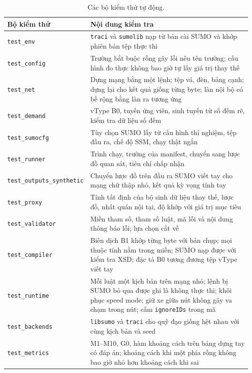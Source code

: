 \documentclass[../main.tex]{subfiles}
\begin{document}
\begin{table}[!htbp]
\centering
\small
\caption{Các bộ kiểm thử tự động.} \label{table:4.5}
\begin{tabular}{|>{\raggedright\arraybackslash}p{3.6cm}|>{\raggedright\arraybackslash}p{9.4cm}|}
\hline
\textbf{Bộ kiểm thử} & \textbf{Nội dung kiểm tra} \\ \hline
\texttt{test\_env} & \texttt{traci} và \texttt{sumolib} nạp từ bản cài SUMO và khớp phiên bản tệp thực thi \\ \hline
\texttt{test\_config} & Trường bắt buộc rỗng gây lỗi nêu tên trường; cấu hình đo thực không bao giờ tự lấy giá trị thay thế \\ \hline
\texttt{test\_net} & Dựng mạng bằng một lệnh; tệp vá, đèn, bảng cạnh; dựng lại cho kết quả giống từng byte; làn nội bộ có bề rộng bằng làn ra tương ứng \\ \hline
\texttt{test\_demand} & vType B0, tuyến ứng viên, sinh tuyến từ số đếm rẽ, kiểm tra dữ liệu số đếm \\ \hline
\texttt{test\_sumocfg} & Tùy chọn SUMO lấy từ cấu hình thí nghiệm, tệp đầu ra, chế độ SSM, chạy thật ngắn \\ \hline
\texttt{test\_runner} & Trình chạy, trường của manifest, chuyển sang lược đồ quan sát, tiêu chí chấp nhận \\ \hline
\texttt{test\_outputs\_\allowbreak synthetic} & Chuyển lược đồ trên đầu ra SUMO viết tay cho mạng chữ thập nhỏ, kết quả kỳ vọng tính tay \\ \hline
\texttt{test\_proxy} & Tính tất định của bộ sinh dữ liệu thay thế, lược đồ, nhất quán nội tại, độ khớp với giá trị mục tiêu \\ \hline
\texttt{test\_validator} & Miền tham số, tham số luật, mã lỗi và nội dung thông báo lỗi; lựa chọn cắt về \\ \hline
\texttt{test\_compiler} & Biên dịch B1 khớp từng byte với bản chụp; mọi thuộc tính nằm trong miền; SUMO nạp được với kiểm tra XSD; đặc tả B0 tương đương tệp vType viết tay \\ \hline
\texttt{test\_runtime} & Mỗi luật một kịch bản trên mạng nhỏ; lệnh bị SUMO bỏ qua được ghi là không thực thi; khôi phục speed mode; giữ xe giữa nút không gây va chạm trong nút; cấm \texttt{ignoreIDs} trong mã \\ \hline
\texttt{test\_backends} & \texttt{libsumo} và \texttt{traci} cho quỹ đạo giống hệt nhau với cùng kịch bản và seed \\ \hline
\texttt{test\_metrics} & M1--M10, G0, hàm khoảng cách trên bảng dựng tay có đáp án; khoảng cách khi một phía rỗng không bao giờ nhỏ hơn khoảng cách khi sai \\ \hline

\end{tabular}
\end{table}
\end{document}
